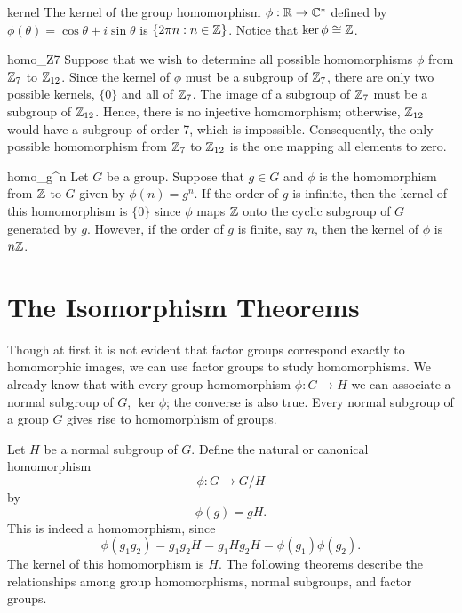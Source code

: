  
\begin{example}{kernel}
The kernel of the group homomorphism $\phi : {\Bbb R} \rightarrow
{\Bbb C}^\ast$ defined by $\phi( \theta ) = \cos \theta + i \sin
\theta$ is $\{ 2 \pi n : n \in {\Bbb Z} \}$. Notice that $\ker \phi
\cong {\Bbb Z}$. 
\end{example}
 
 
\begin{example}{homo_Z7}
Suppose that we wish to determine all possible homomorphisms $\phi$
from ${\Bbb Z}_7$ to  ${\Bbb Z}_{12}$. Since the kernel of $\phi$ must
be a subgroup of  ${\Bbb Z}_7$, there are only two possible
kernels, $\{ 0 \}$ and all of ${\Bbb Z}_7$.  The image of a subgroup
of ${\Bbb Z}_7$ must be a subgroup of ${\Bbb Z}_{12}$. Hence, there is
no injective homomorphism; otherwise, ${\Bbb Z}_{12}$ would have a
subgroup of order 7, which is impossible. Consequently, the only
possible homomorphism from ${\Bbb Z}_7$ to  ${\Bbb Z}_{12}$ is the one
mapping all elements to zero. 
\end{example}
 
 
\begin{example}{homo_g^n}
Let $G$ be a group. Suppose that  $g \in G$ and $\phi$ is the
homomorphism from ${\Bbb Z}$ to $G$ given by $\phi( n ) = g^n$. If the
order of $g$ is infinite, then the kernel of this homomorphism is $\{
0 \}$ since $\phi$ maps ${\Bbb Z}$ onto the cyclic subgroup of $G$
generated by $g$. However, if the order of $g$ is finite, say $n$,
then the kernel of $\phi$ is $n {\Bbb Z}$.
\end{example}
 

 
 
 
\section{The Isomorphism Theorems}
 
 
Though at first it is not evident that factor groups correspond
exactly to homomorphic images, we can use factor groups to study
homomorphisms. We already know that with every group homomorphism
$\phi: G \rightarrow H$ we can associate a normal subgroup of $G$,
$\ker \phi$; the converse is also true. Every normal subgroup of a
group $G$ gives rise to homomorphism of groups. 
 
Let $H$ be a normal subgroup of $G$. Define the {\bfi
natural\/} or {\bfi canonical
homomorphism}  
$$
\phi : G \rightarrow G/H
$$
by
$$
\phi(g) = gH.
$$
This is indeed a homomorphism, since
$$
\phi( g_1 g_2 ) = g_1 g_2 H =  g_1 H g_2 H = \phi( g_1) \phi( g_2 ). 
$$
The kernel of this homomorphism is $H$.	 The following theorems 
describe the relationships among group homomorphisms, normal 
subgroups, and factor groups. 
 
